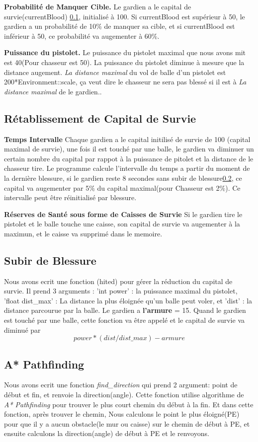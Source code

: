 \documentclass{article}
\begin{document}
\textbf{Probabilité de Manquer Cible.} Le gardien a le capital de survie(currentBlood) \ref{CapitalSurvie}, initialisé à 100. Si currentBlood est supérieur à 50, le gardien a un probabilité de 10\% de manquer sa cible, et si currentBlood est inférieur à 50, ce probabilité va augementer à 60\%.

\textbf{Puissance du pistolet.} Le puissance du pistolet maximal que nous avons mit est 40(Pour chasseur est 50). La puissance du pistolet diminue à mesure que la distance augement. \textsl{La distance maximal} du vol de balle d'un pistolet est 200*Environment::scale, ça veut dire le chasseur ne sera pas blessé si il est à \textsl{La distance maximal} de le gardien..

\subsection{Rétablissement de Capital de Survie}
\label{CapitalSurvie}
\textbf{Temps Intervalle} Chaque gardien a le capital initilisé de survie de 100 (capital maximal de survie), une fois il est touché par une balle, le gardien va diminuer un certain nombre du capital par rappot à la puissance de pitolet et la distance de le chasseur tire. Le programme calcule l'intervalle du temps a partir du moment de la dernière blessure, si le gardien reste 8 secondes sans subir de blessure\ref{SubirBlessure}, ce capital va augementer par 5\% du capital maximal(pour Chasseur est 2\%). Ce intervalle peut être réinitialisé par blessure.

\textbf{Réserves de Santé sous forme de Caisses de Survie} Si le gardien tire le pistolet et le balle touche une caisse, son capital de survie va augementer à la maximun, et le caisse va supprimé dans le memoire.

\subsection{Subir de Blessure}
\label{SubirBlessure}
Nous avons ecrit une fonction (hited) pour gérer la réduction du capital de survie. Il prend 3 arguments : 'int power' : la puissance maximal du pistolet, 'float dist\_max' : La distance la plus éloignée qu'un balle peut voler, et 'dist' : la distance parcourue par la balle. Le gardien a \textbf{l'armure} = 15. Quand le gardien est touché par une balle, cette fonction va être appelé et le capital de survie va diminué par $$power * (dist/dist\_max) - armure$$

\subsection{A* Pathfinding}
Nous avons ecrit une fonction \textsl{find\_direction} qui prend 2 argument: point de début et fin, et renvoie la direction(angle). Cette fonction utilise algorithme de \textsl{A* Pathfinding} pour trouver le plus court chemin du début à la fin. Et dans cette fonction, après trouver le chemin, Nous calculons le point le plus éloigné(PE) pour que il y a aucun obstacle(le mur ou caisse) sur le chemin de début à PE, et ensuite calculons la direction(angle) de début à PE et le renvoyons. 
\end{document}
